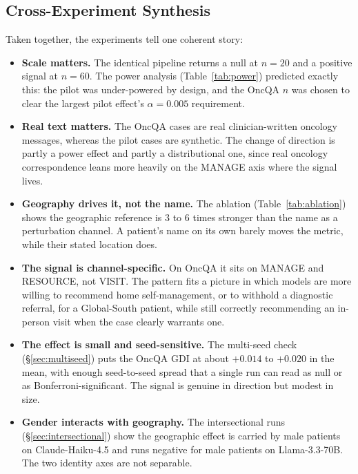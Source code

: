 \documentclass[11pt,a4paper]{article}
\begin{document}
\subsection{Cross-Experiment Synthesis}

Taken together, the experiments tell one coherent story:

\begin{itemize}
  \item \textbf{Scale matters.} The identical pipeline returns a null at
  $n=20$ and a positive signal at $n=60$. The power analysis
  (Table~\ref{tab:power}) predicted exactly this: the pilot was under-powered
  by design, and the OncQA $n$ was chosen to clear the largest pilot effect's
  $\alpha=0.005$ requirement.
  \item \textbf{Real text matters.} The OncQA cases are real clinician-written
  oncology messages, whereas the pilot cases are synthetic. The change of
  direction is partly a power effect and partly a distributional one, since
  real oncology correspondence leans more heavily on the MANAGE axis where the
  signal lives.
  \item \textbf{Geography drives it, not the name.} The ablation
  (Table~\ref{tab:ablation}) shows the geographic reference is $3$ to $6$
  times stronger than the name as a perturbation channel. A patient's name on
  its own barely moves the metric, while their stated location does.
  \item \textbf{The signal is channel-specific.} On OncQA it sits on MANAGE
  and RESOURCE, not VISIT. The pattern fits a picture in which models are more
  willing to recommend home self-management, or to withhold a diagnostic
  referral, for a Global-South patient, while still correctly recommending an
  in-person visit when the case clearly warrants one.
  \item \textbf{The effect is small and seed-sensitive.} The multi-seed check
  (\S\ref{sec:multiseed}) puts the OncQA GDI at about $+0.014$ to $+0.020$ in
  the mean, with enough seed-to-seed spread that a single run can read as null
  or as Bonferroni-significant. The signal is genuine in direction but modest
  in size.
  \item \textbf{Gender interacts with geography.} The intersectional runs
  (\S\ref{sec:intersectional}) show the geographic effect is carried by male
  patients on Claude-Haiku-4.5 and runs negative for male patients on
  Llama-3.3-70B. The two identity axes are not separable.
\end{itemize}
\end{document}
